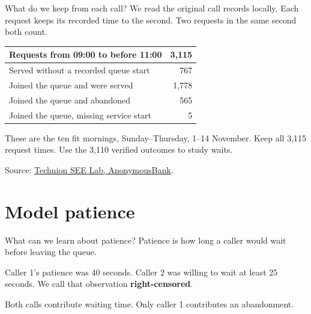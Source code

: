 \documentclass{beamer}
\begin{document}
\begin{frame}{What do we keep from each call?}
  \small
  We read the original call records locally. Each request keeps its
  recorded time to the second. Two requests in the same second both count.

  \vspace{0.6em}
  \centering
  \begin{tabular}{@{}lr@{}}
    \toprule
    Requests from 09:00 to before 11:00 & 3,115\\
    \midrule
    Served without a recorded queue start & 767\\
    Joined the queue and were served & 1,778\\
    Joined the queue and abandoned & 565\\
    Joined the queue, missing service start & 5\\
    \bottomrule
  \end{tabular}

  \vspace{0.6em}
  \raggedright
  These are the ten fit mornings, Sunday--Thursday, 1--14 November.
  Keep all 3,115 request times. Use the 3,110 verified outcomes to study waits.

  \vspace{0.35em}
  {\scriptsize Source: \href{https://seelab.net.technion.ac.il/data/}{Technion SEE Lab, AnonymousBank}.}
\end{frame}

\section{Model patience}

\begin{frame}{What can we learn about patience?}
  Patience is how long a caller would wait before leaving the queue.

  \begin{center}
  \end{center}

  Caller 1's patience was 40 seconds. Caller 2 was willing to wait at
  least 25 seconds. We call that observation \textbf{right-censored}.

  Both calls contribute waiting time. Only caller 1 contributes an abandonment.
\end{frame}
\end{document}
